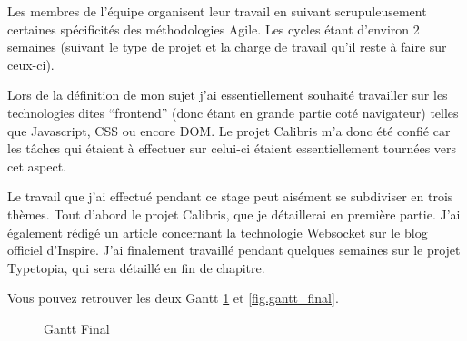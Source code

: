 \documentclass[12pt,a4paper]{book}
\begin{document}
Les membres de l'équipe organisent leur travail en suivant scrupuleusement certaines spécificités des méthodologies Agile. Les cycles étant d'environ 2 semaines (suivant le type de projet et la charge de travail qu'il reste à faire sur ceux-ci).

Lors de la définition de mon sujet j'ai essentiellement souhaité travailler sur les technologies dites ``frontend'' (donc étant en grande partie coté navigateur) telles que Javascript, CSS ou encore DOM. Le projet Calibris m'a donc été confié car les tâches qui étaient à effectuer sur celui-ci étaient essentiellement tournées vers cet aspect.

Le travail que j'ai effectué pendant ce stage peut aisément se subdiviser en trois thèmes. Tout d'abord le projet Calibris, que je détaillerai en première partie. J'ai également rédigé un article concernant la technologie Websocket sur le blog officiel d'Inspire. J'ai finalement travaillé pendant quelques semaines sur le projet Typetopia, qui sera détaillé en fin de chapitre.

Vous pouvez retrouver les deux Gantt \cref{fig.gantt_initial} et \cref{fig.gantt_final}.

\begin{landscape}
\begin{figure}[htp] 
	\caption{Gantt Final}
	\label{fig.gantt_initial}
\end{figure}
\end{landscape}
\end{document}
